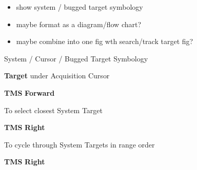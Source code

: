 \begin{checklistenumerate}
{{{\begin{minipage}[t][60mm][t]{\marginparwidth}
                \begin{itemize}[leftmargin=1em]
                    \item show system / bugged target symbology
                    \item maybe format as a diagram/flow chart?
                    \item maybe combine into one fig wth search/track target fig?
                \end{itemize}
            \end{minipage}
        }
        \caption{System / Cursor /  Bugged Target Symbology}
    }
    \begin{subenumerate}
        \item \textbf{Target} \dotfill under Acquisition Cursor
        \item \textbf{TMS} \dotfill \textbf{Forward}
    \end{subenumerate}
    To select closest System Target 
    \begin{subenumerate}
        \item \textbf{TMS} \dotfill \textbf{Right}
    \end{subenumerate}
    To cycle through System Targets in range order
    \begin{subenumerate}
        \item \textbf{TMS} \dotfill \textbf{Right}
    \end{subenumerate}}
\end{checklistenumerate}

\marginfigrestore


